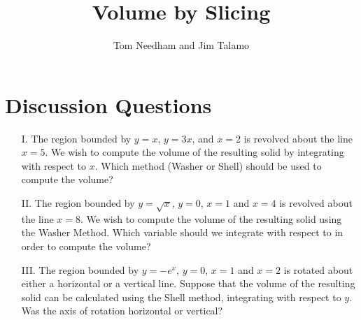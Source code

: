 \documentclass[handout]{ximera}
\author{Tom Needham and Jim Talamo}
\title[]{Volume by Slicing}
\begin{document}
\begin{abstract}
\end{abstract}
\maketitle

\vspace{-0.9in}

\section{Discussion Questions}

\begin{problem}
\begin{enumerate}
\item[I.] The region bounded by $y=x$, $y=3x$, and $x=2$ is revolved about the line $x=5$. We wish to compute the volume of the resulting solid by integrating with respect to $x$. Which method (Washer or Shell) should be used to compute the volume?

\item[II.]  The region bounded by $y=\sqrt{x}$, $y=0$, $x=1$ and $x=4$ is revolved about the line $x=8$.  We wish to compute the volume of the resulting solid using the Washer Method. Which variable should we integrate with respect to in order to compute the volume?

\item[III.] The region bounded by $y=-e^x$, $y=0$, $x=1$ and $x=2$ is rotated about either a horizontal or a vertical line. Suppose that the volume of the resulting solid can be calculated using the Shell method, integrating with respect to $y$. Was the axis of rotation horizontal or vertical?
\end{enumerate}
\end{problem}

\begin{freeResponse}

\end{freeResponse}
\end{document}
